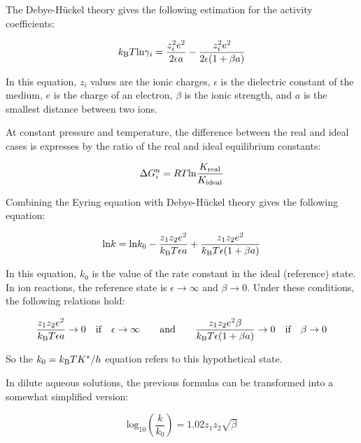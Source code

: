 The Debye-H\"uckel theory gives the following estimation for the activity coefficients:

\begin{equation}
k_{\text B} T \text {ln} \gamma_i = \frac{z_i^2 e^2}{2 \epsilon a} - \frac{z_i^2 e^2}{2 \epsilon (1 + \beta a)}
\end{equation}

In this equation, $z_i$ values are the ionic charges,  $\epsilon$ is the dielectric constant of the medium, $e$ is the charge of an electron, $\beta$ is the ionic strength, and $a$ is the smallest distance between two ions. 

At constant pressure and temperature, the difference between the real and ideal cases is expresses by the ratio of the real and ideal  equilibrium constants:

\begin{equation}
\Delta G_i^{\text n} = R T \text {ln} \frac{K_\text{real}}{K_\text{ideal}}
\end{equation}

Combining the Eyring equation with Debye-H\"uckel theory gives the following equation:

\begin{equation}
\text {ln} k = \text {ln} k_0 - \frac{z_1 z_2 e^2}{k_{\text B} T \epsilon a} + \frac{z_1 z_2 e^2}{k_{\text B} T \epsilon (1 + \beta a)}
\end{equation}

In this equation, $k_0$ is the value of the rate constant in the ideal (reference) state. In ion reactions, the reference state is $\epsilon \rightarrow \infty$ and $\beta \rightarrow 0$. Under these conditions, the following relations hold:

\begin{equation}
 \frac{z_1 z_2 e^2}{k_{\text B} T \epsilon a} \rightarrow 0 \quad \text{if} \quad \epsilon \rightarrow \infty \quad \quad \text{and} \quad \quad  \frac{z_1 z_2 e^2 \beta}{k_{\text B} T \epsilon (1 + \beta a)} \rightarrow 0 \quad \text{if} \quad \beta \rightarrow 0
\end{equation}

So the $k_0 = k_{\text B} T K^* / h$ equation refers to this hypothetical state.

In dilute aqueous solutions, the previous formulas can be transformed into a somewhat simplified version:

\begin{equation}
\label{bronsted}
\text {log}_{10} \left ( \frac{k}{k_0} \right ) = 1.02 z_1 z_2 \sqrt{\beta}
\end{equation}

